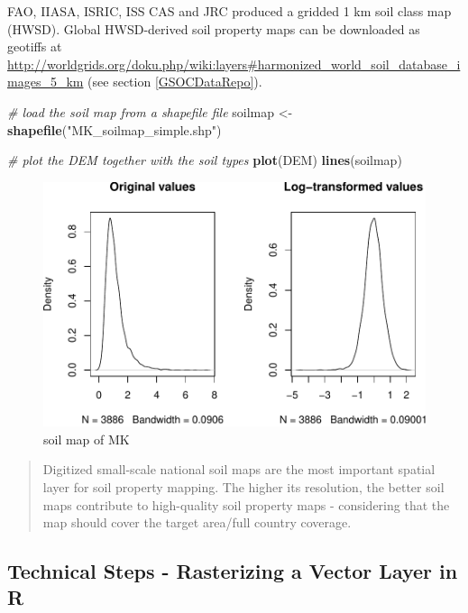 \documentclass[10pt,b5paper,]{book}
\newenvironment{Shaded}{\begin{snugshade}}{\end{snugshade}}
\newcommand{\CommentTok}[1]{\textcolor[rgb]{0.56,0.35,0.01}{\textit{#1}}}
\newcommand{\KeywordTok}[1]{\textcolor[rgb]{0.13,0.29,0.53}{\textbf{#1}}}
\newcommand{\NormalTok}[1]{#1}
\newcommand{\StringTok}[1]{\textcolor[rgb]{0.31,0.60,0.02}{#1}}
\theoremstyle{definition}
\theoremstyle{definition}
\theoremstyle{definition}
\theoremstyle{remark}
\begin{document}
FAO, IIASA, ISRIC, ISS CAS and JRC produced a gridded 1 km soil class
map (HWSD). Global HWSD-derived soil property maps can be downloaded as
geotiffs at
\url{http://worldgrids.org/doku.php/wiki:layers\#harmonized_world_soil_database_images_5_km}
(see section \ref{GSOCDataRepo}).

\begin{Shaded}
\begin{Highlighting}[]
\CommentTok{# load the soil map from a shapefile file}
\NormalTok{soilmap <-}\StringTok{ }\KeywordTok{shapefile}\NormalTok{(}\StringTok{"MK_soilmap_simple.shp"}\NormalTok{)}

\CommentTok{# plot the DEM together with the soil types}
\KeywordTok{plot}\NormalTok{(DEM)}
\KeywordTok{lines}\NormalTok{(soilmap)}
\end{Highlighting}
\end{Shaded}

\begin{figure}
\centering
\includegraphics{SOCMapping_files/figure-latex/unnamed-chunk-16-1.pdf}
\caption{\label{fig:unnamed-chunk-16}soil map of MK}
\end{figure}

\begin{quote}
Digitized small-scale national soil maps are the most important spatial
layer for soil property mapping. The higher its resolution, the better
soil maps contribute to high-quality soil property maps - considering
that the map should cover the target area/full country coverage.
\end{quote}

\hypertarget{technical-steps---rasterizing-a-vector-layer-in-r}{%
\subsection{Technical Steps - Rasterizing a Vector Layer in
R}\label{technical-steps---rasterizing-a-vector-layer-in-r}}
\end{document}
